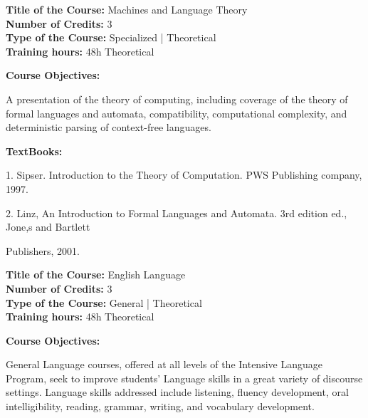 \documentclass[12pt,a4paper]{article}
\begin{document}
\newpage
\textbf{Title of the Course:} Machines and Language Theory\\
\textbf{Number of Credits:} 3\\
\textbf{Type of the Course:} Specialized | Theoretical\\
\textbf{Training hours:} 48h Theoretical\par\vspace{4pt}
\textbf{Course Objectives:}\par\vspace{2pt}
A presentation of the theory of computing, including coverage of the theory of formal languages
and automata, compatibility, computational complexity, and deterministic parsing of context-free
languages.\par\vspace{4pt}
\textbf{TextBooks:}\par\vspace{2pt}
1. Sipser. Introduction to the Theory of Computation. PWS Publishing company, 1997.\par
2. Linz, An Introduction to Formal Languages and Automata. 3rd edition ed., Jone,s and Bartlett\par
Publishers, 2001.\par
\vspace{4pt}

\newpage
\nopagebreak
\textbf{Title of the Course:} English Language\\
\textbf{Number of Credits:} 3\\
\textbf{Type of the Course:} General | Theoretical\\
\textbf{Training hours:} 48h Theoretical\par\vspace{4pt}
\textbf{Course Objectives:}\par\vspace{2pt}
General Language courses, offered at all levels of the Intensive Language Program, seek to
improve students' Language skills in a great variety of discourse settings. Language skills
addressed include listening, fluency development, oral intelligibility, reading, grammar, writing,
and vocabulary development.\par\vspace{4pt}
\end{document}

